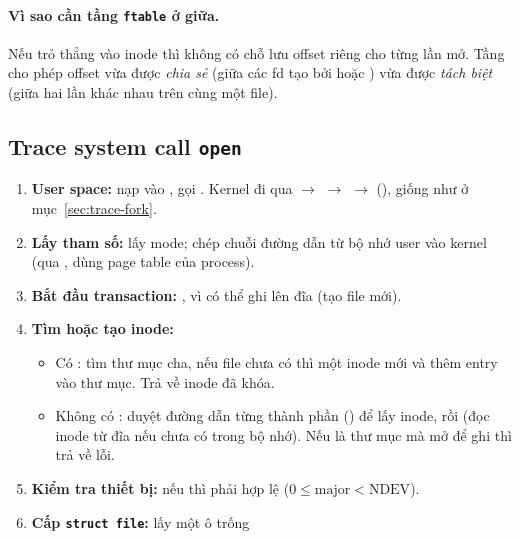 \paragraph{Vì sao cần tầng \texttt{ftable} ở giữa.}
Nếu  trỏ thẳng vào inode thì không có chỗ lưu offset riêng cho
từng lần mở. Tầng  cho phép offset vừa được \emph{chia sẻ}
(giữa các fd tạo bởi  hoặc ) vừa được \emph{tách biệt}
(giữa hai lần  khác nhau trên cùng một file).

\subsection{Trace system call \texttt{open}}
\label{sec:trace-open}

\begin{enumerate}
  \item \textbf{User space:}  nạp  vào
        , gọi . Kernel đi qua 
        $\to$  $\to$  $\to$ 
        (), giống như  ở mục~\ref{sec:trace-fork}.
  \item \textbf{Lấy tham số:}  lấy mode;
         chép chuỗi đường dẫn từ bộ nhớ user vào
        kernel (qua , dùng page table của process).
  \item \textbf{Bắt đầu transaction:} , vì  có thể
        ghi lên đĩa (tạo file mới).
  \item \textbf{Tìm hoặc tạo inode:}
        \begin{itemize}
          \item Có :  tìm thư
                mục cha, nếu file chưa có thì  một inode mới và
                 thêm entry vào thư mục. Trả về inode đã khóa.
          \item Không có :  duyệt đường dẫn
                từng thành phần () để lấy inode, rồi
                 (đọc inode từ đĩa nếu chưa có trong bộ nhớ).
                Nếu là thư mục mà mở để ghi thì trả về lỗi.
        \end{itemize}
  \item \textbf{Kiểm tra thiết bị:} nếu  thì  phải
        hợp lệ ($0 \le \text{major} < \text{NDEV}$).
  \item \textbf{Cấp \texttt{struct file}:}  lấy một ô trống

\end{enumerate}
